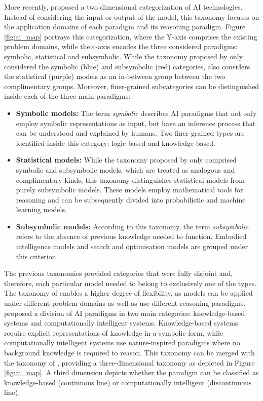 More recently, \cite{corea_ai_2019} proposed a two dimensional categorization of AI technologies. Instead of considering the input or output of the model, this taxonomy focuses on the application domains of each paradigm and its reasoning paradigm. Figure \ref{fig:ai_map} portrays this categorization, where the Y-axis comprises the existing problem domains, while the$\times$-axis encodes the three considered paradigms: symbolic, statistical and subsymbolic. While the taxonomy proposed by \cite{lieberman_symbolic_nodate} only considered the symbolic (blue) and subsymbolic (red) categories, \cite{corea_ai_2019} also considers the statistical (purple) models as an in-between group between the two complimentary groups. Moreover, finer-grained subcategories can be distinguished inside each of the three main paradigms:
\begin{itemize}
    \item \textbf{Symbolic models:} The term \textit{symbolic} describes AI paradigms that not only employ symbolic representations as input, but have an inference process that can be understood and explained by humans. Two finer grained types are identified inside this category: logic-based and knowledge-based.
    \item \textbf{Statistical models:} While the taxonomy proposed by \cite{lieberman_symbolic_nodate} only comprised symbolic and subsymbolic models, which are treated as analogous and complimentary kinds, this taxonomy distinguishes statistical models from purely subsymbolic models. These models employ mathematical tools for reasoning and can be subsequently divided into probabilistic and machine learning models.
    \item\textbf{Subsymbolic models:} According to this taxonomy, the term \textit{subsymbolic} refers to the absence of previous knowledge needed to function. Embodied intelligence models and search and optimisation models are grouped under this criterion.
\end{itemize}

The previous taxonomies provided categories that were fully disjoint and, therefore, each particular model needed to belong to exclusively one of the types. The taxonomy of \cite{corea_ai_2019} enables a higher degree of flexibility, as models can be applied under different problem domains as well as use different reasoning paradigms.
\cite{hopgood_2009_knowledge-based} proposed a division of AI paradigms in two main categories: knowledge-based systems and computationally intelligent systems. Knowledge-based systems require explicit representations of knowledge in a symbolic form, while computationally intelligent systems use nature-inspired paradigms where no background knowledge is required to reason. This taxonomy can be merged with the taxonomy of \cite{corea_ai_2019}, providing a three-dimensional taxonomy as depicted in Figure \ref{fig:ai_map}. A third dimension depicts whether the paradigm can be classified as knowledge-based (continuous line) or computationally intelligent (discontinuous line). 

